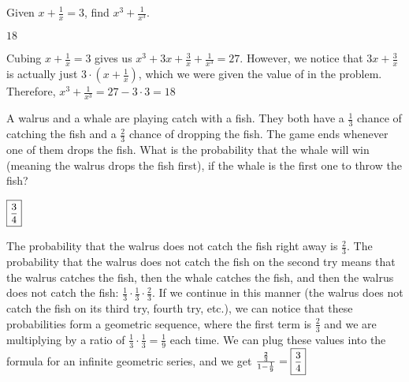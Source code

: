 \documentclass[11pt]{article}
\begin{document}
\begin{problem} %
Given $x + \frac{1}{x} = 3$, find $x^3+\frac{1}{x^3}$.
\end{problem}
\begin{answer}
$\boxed{18}$
\end{answer}
\begin{solution}
Cubing $x + \frac{1}{x} = 3$ gives us $x^3+3x+\frac{3}{x}+\frac{1}{x^3} = 27$. However, we notice that $3x+\frac{3}{x}$ is actually just $3\cdot (x + \frac{1}{x})$, which we were given the value of in the problem. Therefore, $x^3+\frac{1}{x^3} = 27 - 3 \cdot 3 = \boxed{18}$
\end{solution}

\begin{problem} %
A walrus and a whale are playing catch with a fish. They both have a $\frac{1}{3}$ chance of catching the fish and a $\frac{2}{3}$ chance of dropping the fish. The game ends whenever one of them drops the fish. What is the probability that the whale will win (meaning the walrus drops the fish first), if the whale is the first one to throw the fish?
\end{problem}
\begin{answer}
$\small\boxed{\frac{3}{4}\normalsize}$
\end{answer}
\begin{solution}
The probability that the walrus does not catch the fish right away is $\frac{2}{3}$. The probability that the walrus does not catch the fish on the second try means that the walrus catches the fish, then the whale catches the fish, and then the walrus does not catch the fish: $\frac{1}{3}\cdot\frac{1}{3}\cdot\frac{2}{3}$. If we continue in this manner (the walrus does not catch the fish on its third try, fourth try, etc.), we can notice that these probabilities form a geometric sequence, where the first term is $\frac{2}{3}$ and we are multiplying by a ratio of $\frac{1}{3}\cdot\frac{1}{3} = \frac{1}{9}$ each time. We can plug these values into the formula for an infinite geometric series, and we get $\frac{\frac{2}{3}}{1 - \frac{1}{9}} = \small\boxed{\frac{3}{4}\normalsize}$
\end{solution}
\end{document}
